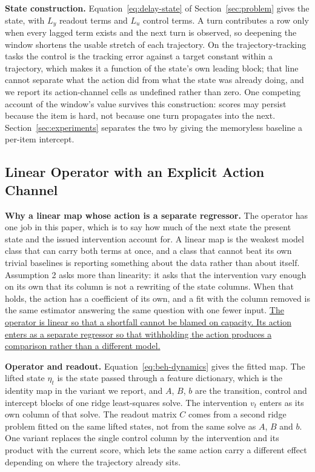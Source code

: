 \textbf{State construction.} Equation~\eqref{eq:delay-state} of Section~\ref{sec:problem}
gives the state, with $L_y$ readout terms and $L_u$ control terms. A turn contributes a row only
when every lagged term exists and the next turn is observed, so deepening the window shortens
the usable stretch of each trajectory. On the trajectory-tracking tasks the control is the
tracking error against a target constant within a trajectory, which makes it a function of the
state's own leading block; that line cannot separate what the action did from what the state was
already doing, and we report its action-channel cells as undefined rather than zero. One
competing account of the window's value survives this construction: scores may persist because
the item is hard, not because one turn propagates into the next. Section~\ref{sec:experiments}
separates the two by giving the memoryless baseline a per-item intercept.

\subsection{Linear Operator with an Explicit Action Channel}

\textbf{Why a linear map whose action is a separate regressor.} The operator has one job in
this paper, which is to say how much of the next state the present state and the issued
intervention account for. A linear map is the weakest model class that can carry both terms at
once, and a class that cannot beat its own trivial baselines is reporting something about the
data rather than about itself. Assumption 2 asks more than linearity: it asks that the
intervention vary enough on its own that its column is not a rewriting of the state columns.
When that holds, the action has a coefficient of its own, and a fit with the column removed is
the same estimator answering the same question with one fewer input.
\uline{The operator is linear so that a shortfall cannot be blamed on capacity. Its action
enters as a separate regressor so that withholding the action produces a comparison rather than
a different model.}

\textbf{Operator and readout.} Equation~\eqref{eq:beh-dynamics} gives the fitted map. The
lifted state $\eta_t$ is the state passed through a feature dictionary, which is the identity
map in the variant we report, and $A$, $B$, $b$ are the transition, control and intercept
blocks of one ridge least-squares solve. The intervention $v_t$ enters as its own column of
that solve. The readout matrix $C$ comes from a second ridge problem fitted on the same lifted
states, not from the same solve as $A$, $B$ and $b$. One variant replaces the single control
column by the intervention and its product with the current score, which lets the same action
carry a different effect depending on where the trajectory already sits.

